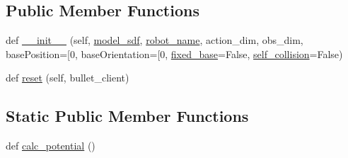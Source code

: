 \subsection*{Public Member Functions}
\begin{DoxyCompactItemize}
\item 
def \hyperlink{classpybullet-gym_1_1pybulletgym_1_1envs_1_1roboschool_1_1robots_1_1robot__bases_1_1_s_d_f_based_robot_afe844d1a26e77a5510984a6ed033978a}{\+\_\+\+\_\+init\+\_\+\+\_\+} (self, \hyperlink{classpybullet-gym_1_1pybulletgym_1_1envs_1_1roboschool_1_1robots_1_1robot__bases_1_1_s_d_f_based_robot_ab0d6e89ed91a5531b99e022dff1e989a}{model\+\_\+sdf}, \hyperlink{classpybullet-gym_1_1pybulletgym_1_1envs_1_1roboschool_1_1robots_1_1robot__bases_1_1_xml_based_robot_a27a9dfbfbfd4f3478cc4ea4ace80af97}{robot\+\_\+name}, action\+\_\+dim, obs\+\_\+dim, base\+Position=\mbox{[}0, base\+Orientation=\mbox{[}0, \hyperlink{classpybullet-gym_1_1pybulletgym_1_1envs_1_1roboschool_1_1robots_1_1robot__bases_1_1_s_d_f_based_robot_a1f91f56c1e90a437452ee0a175c4fb5c}{fixed\+\_\+base}=False, \hyperlink{classpybullet-gym_1_1pybulletgym_1_1envs_1_1roboschool_1_1robots_1_1robot__bases_1_1_xml_based_robot_ab6ba95cc9efcb674bb70711d09755b02}{self\+\_\+collision}=False)
\item 
def \hyperlink{classpybullet-gym_1_1pybulletgym_1_1envs_1_1roboschool_1_1robots_1_1robot__bases_1_1_s_d_f_based_robot_a2387b6cefb405995a09bd537f2a6b515}{reset} (self, bullet\+\_\+client)
\end{DoxyCompactItemize}
\subsection*{Static Public Member Functions}
\begin{DoxyCompactItemize}
\item 
def \hyperlink{classpybullet-gym_1_1pybulletgym_1_1envs_1_1roboschool_1_1robots_1_1robot__bases_1_1_s_d_f_based_robot_a385bf53c8e8e6cf1537089fb77636b5f}{calc\+\_\+potential} ()
\end{DoxyCompactItemize}
